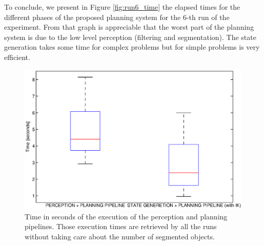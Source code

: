 
To conclude, we present in Figure \ref{fig:run6_time} the elapsed times for the different phases of the proposed planning system for the $6$-th run of the experiment. From that graph is appreciable that the worst part of the planning system is due to the low level perception (filtering and segmentation). The state generation takes some time for complex problems but for simple problems is very efficient. 


\begin{figure}
\centering
\includegraphics[width=13cm]{Img/experiments/exp_good/data/pipeline.eps}
\caption{Time in seconds of the execution of the perception and planning pipelines. Those execution times are retrieved by all the runs without taking care about the number of segmented objects.}\label{fig:pipeline}
\end{figure}

